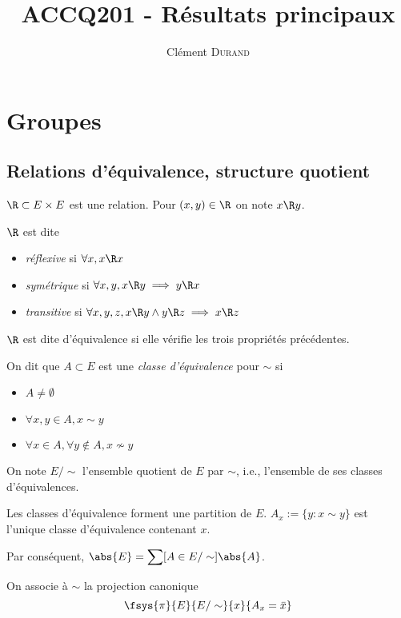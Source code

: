 \documentclass[a4paper,11pt,twocolumn]{article}\usepackage[landscape]{geometry}
\title[Structures algébriques finies]{ACCQ201 - Résultats principaux}
\author[\nolinkurl{neze@eleves.polytechnique.fr}]{Clément \textsc{Durand}}
\begin{document}

\maketitle

\section{Groupes}

  \subsection{Relations d'équivalence, structure quotient}

     $\R\subset E\times E$ est une relation. Pour $(x,y)\in\R$ on note $x\R y$.

     $\R$ est dite
    \begin{itemize}
      \item \emph{réflexive} si $\forall x, x\R x$
      \item \emph{symétrique} si $\forall x,y, x\R y \implies y\R x$
      \item \emph{transitive} si $\forall x,y,z, x\R y \wedge y\R z \implies x\R z$
    \end{itemize}

    $\R$ est dite d'équivalence si elle vérifie les trois propriétés précédentes.

     On dit que $A\subset E$ est une \emph{classe d'équivalence} pour $\sim$ si
    \begin{itemize}
      \item $A\neq\emptyset$
      \item $\forall x,y\in A, x\sim y$
      \item $\forall x\in A, \forall y\notin A, x\nsim y$
    \end{itemize}

    On note $E/\sim$ l'ensemble quotient de $E$ par $\sim$, i.e., l'ensemble de ses classes d'équivalences.

     Les classes d'équivalence forment une partition de $E$. $A_x:=\{y:x\sim y\}$ est l'unique classe d'équivalence contenant $x$.

    Par conséquent, $\displaystyle\abs{E} = \sum[A\in E/\sim]{\abs{A}}$.

     On associe à $\sim$ la projection canonique
    \[\fsys{\pi}{E}{E/\sim}{x}{A_x = \bar{x}}\]
\end{document}
